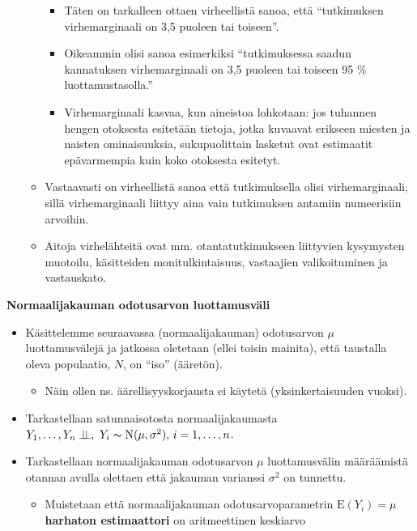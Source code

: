 \documentclass[
]{book}
\providecommand{\tightlist}{%
  \setlength{\itemsep}{0pt}\setlength{\parskip}{0pt}}
\begin{document}
\begin{itemize}
\begin{itemize}
    \begin{itemize}
    \tightlist
    \item
      Täten on tarkalleen ottaen virheellistä sanoa, että ``tutkimuksen virhemarginaali on 3,5 puoleen tai toiseen''.
    \item
      Oikeammin olisi sanoa esimerkiksi ``tutkimuksessa saadun kannatuksen virhemarginaali on 3,5 puoleen tai toiseen 95 \% luottamustasolla.''
    \item
      Virhemarginaali kasvaa, kun aineistoa lohkotaan: jos tuhannen hengen otoksesta esitetään tietoja, jotka kuvaavat erikseen miesten ja naisten ominaisuuksia, sukupuolittain lasketut ovat estimaatit epävarmempia kuin koko otoksesta esitetyt.
    \end{itemize}
  \item
    Vastaavasti on virheellistä sanoa että tutkimuksella olisi virhemarginaali, sillä virhemarginaali liittyy aina vain tutkimuksen antamiin numeerisiin arvoihin.
  \item
    Aitoja virhelähteitä ovat mm. otantatutkimukseen liittyvien kysymysten muotoilu, käsitteiden monitulkintaisuus, vastaajien valikoituminen ja vastauskato.
  \end{itemize}
\end{itemize}

\textbf{Normaalijakauman odotusarvon luottamusväli}

\begin{itemize}
\item
  Käsittelemme seuraavassa (normaalijakauman) odotusarvon \(\mu\) luottamusvälejä ja jatkossa oletetaan (ellei toisin mainita), että taustalla oleva populaatio, \(N\), on ``iso'' (ääretön).

  \begin{itemize}
  \tightlist
  \item
    Näin ollen ns. äärellisyyskorjausta ei käytetä (yksinkertaisuuden vuoksi).
  \end{itemize}
\item
  Tarkastellaan satunnaisotosta normaalijakaumasta
  \(Y_1, \ldots, Y_n \perp \!\!\! \perp, \,\, Y_i \thicksim \text{N}(\mu, \sigma^2),\, i=1,\ldots,n\).
\item
  Tarkastellaan normaalijakauman odotusarvon \(\mu\) luottamusvälin määräämistä otannan avulla olettaen että jakauman varianssi \(\sigma^2\) on tunnettu.

  \begin{itemize}
  \tightlist
  \item
    Muistetaan että normaalijakauman odotusarvoparametrin \(\text{E}(Y_i) = \mu\) \textbf{harhaton estimaattori} on aritmeettinen keskiarvo
  \end{itemize}
\end{itemize}
\end{document}
